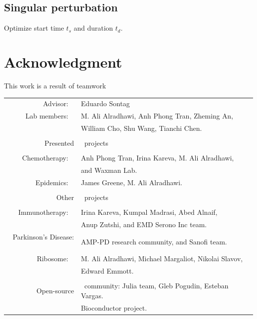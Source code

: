 \documentclass[10pt]{beamer}
\begin{document}
\subsection{Singular perturbation}
\begin{frame}{Optimize start time $t_s$ and duration $t_d$.}
	
\end{frame}

\section{Acknowledgment}

\begin{frame}{This work is a result of teamwork}
	\small \hspace{1cm}
	{\begin{tabular}{r@{}l}
			Advisor:   \  & Eduardo Sontag \\ 
			Lab members:   \  & M. Ali Alradhawi, Anh Phong Tran, Zheming An, \\ 
			&  William Cho, Shu Wang, Tianchi Chen. \\ \\
			Presented & \, projects  \\ \\
			Chemotherapy: \  & Anh Phong Tran, Irina Kareva, M. Ali Alradhawi, \\ 
			& and Waxman Lab.\\
			Epidemics: \ & James Greene, M. Ali Alradhawi. \\ \\
			Other & \, projects  \\ \\
			\scriptsize Immunotherapy: \ & Irina Kareva, Kumpal Madrasi, Abed Alnaif, \\ & Anup Zutshi, and EMD Serono Inc team. \\ 
			\scriptsize Parkinson's Disease: \ & AMP-PD research community, and Sanofi team.  \\ 
			Ribosome: \ & M. Ali Alradhawi, Michael Margaliot, Nikolai Slavov, \\ & Edward Emmott. \\ \\
			Open-source & \, community: Julia team, Gleb Pogudin, Esteban Vargas.  \\
			& Bioconductor project.  \\
		\end{tabular}
	}
\end{frame}
\end{document}
